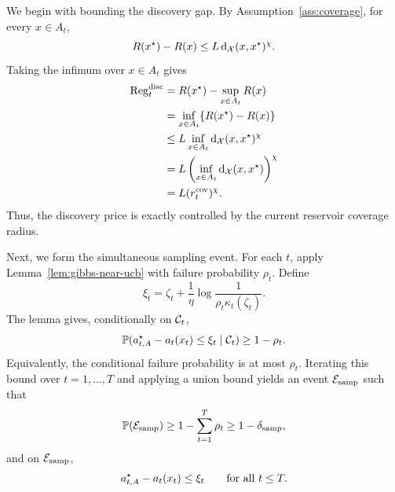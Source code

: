 We begin with bounding the discovery gap. By Assumption~\ref{ass:coverage}, for every $x\in A_t$,
\[
R(x^\star)-R(x)
\le
L\,\mathrm d_{\mathcal{X}}(x,x^\star)^\chi.
\]
Taking the infimum over $x\in A_t$ gives
\begin{align}
\mathrm{Reg}_t^{\rm disc}
&=
R(x^\star)-\sup_{x\in A_t}R(x) \notag\\
&=
\inf_{x\in A_t}\{R(x^\star)-R(x)\} \notag\\
&\le
L\inf_{x\in A_t}\mathrm d_{\mathcal{X}}(x,x^\star)^\chi \notag\\
&=
L\left(\inf_{x\in A_t}\mathrm d_{\mathcal{X}}(x,x^\star)\right)^\chi \notag\\
&=
L(r_t^{\rm cov})^\chi.
\label{eq:disc-gap-bound}
\end{align}
Thus, the discovery price is exactly controlled by the current reservoir coverage radius.

Next, we form the simultaneous sampling event. For each $t$, apply Lemma~\ref{lem:gibbs-near-ucb} with failure probability $\rho_t$. Define
\[
\xi_t
=
\zeta_t+\frac1\eta\log\frac1{\rho_t\kappa_t(\zeta_t)}.
\]
The lemma gives, conditionally on $\mathcal{C}_t$,
\[
\mathbb{P}(a_{t,A}^\star-a_t(x_t)\le \xi_t\mid \mathcal{C}_t)\ge1-\rho_t.
\]
Equivalently, the conditional failure probability is at most $\rho_t$. Iterating this bound over
$t=1,\ldots,T$ and applying a union bound yields an event $\mathcal E_{\rm samp}$ such that
\[
\mathbb{P}(\mathcal E_{\rm samp})\ge 1-\sum_{t=1}^T\rho_t\ge1-\delta_{\rm samp},
\]
and on $\mathcal E_{\rm samp}$,
\begin{equation}
a_{t,A}^\star-a_t(x_t)\le \xi_t
\qquad\text{for all }t\le T.
\label{eq:sampling-event}
\end{equation}

